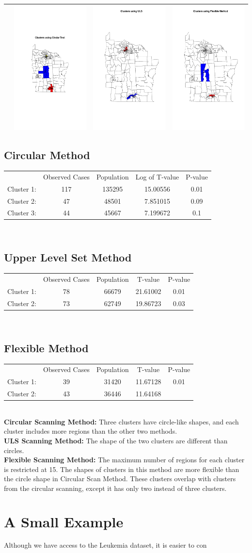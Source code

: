 \documentclass[12pt]{article}
\begin{document}
\begin{enumerate}
\begin{tabular}{|c|c|c|c|}
	 & \includegraphics[scale=0.3]{cluster_circular} & \includegraphics[scale=0.2]{cluster_uls} & \includegraphics[scale=0.2]{cluster_flexible}\\
	\hline
	\end{tabular}
	
	 \subsection {Circular Method} 
	
	 \begin{tabular}{|c|c|c|c|c|}
	 \hline
	 & Observed Cases & Population & Log of T-value& P-value  \\
	Cluster 1: & 117 & 135295 & 15.00556 & 0.01\\ 
	Cluster 2:& 47 & 48501 & 7.851015 & 0.09\\
	Cluster 3:& 44 & 45667 & 7.199672 & 0.1\\
	\hline
	\end{tabular} \\
	
	\subsection{Upper Level Set Method} 
	
	 \begin{tabular}{|c|c|c|c|c|}
	 \hline
	 & Observed Cases & Population & T-value &P-value  \\
	Cluster 1: & 78 & 66679 & 21.61002 & 0.01\\ 
	Cluster 2:& 73 & 62749 & 19.86723 & 0.03\\
	\hline
	\end{tabular} \\
	
	\subsection{Flexible Method} 
	
	 \begin{tabular}{|c|c|c|c|c|}
	 \hline
	 & Observed Cases & Population & T-value & P-value  \\
	Cluster 1: & 39 & 31420 & 11.67128& 0.01\\ 
	Cluster 2:& 43 & 36446 & 11.64168 &\\
	\hline
	\end{tabular} \\
	
	
	\textbf{Circular Scanning Method:} Three clusters have circle-like shapes, and each cluster includes more regions than the other two methods.\\
	\textbf{ULS Scanning Method:} The shape of the two clusters are different than circles. \\
	\textbf{Flexible Scanning Method:} The maximum number of regions for each cluster is restricted at 15.	
	The shapes of clusters in this method are more flexible than the circle shape in Circular Scan Method. These clusters overlap with clusters from the circular scanning, except it has only two instead of three clusters. \\
	
	\section{A Small Example}
	Although we have access to the Leukemia dataset, it is easier to con
\end{enumerate}
\end{document}
